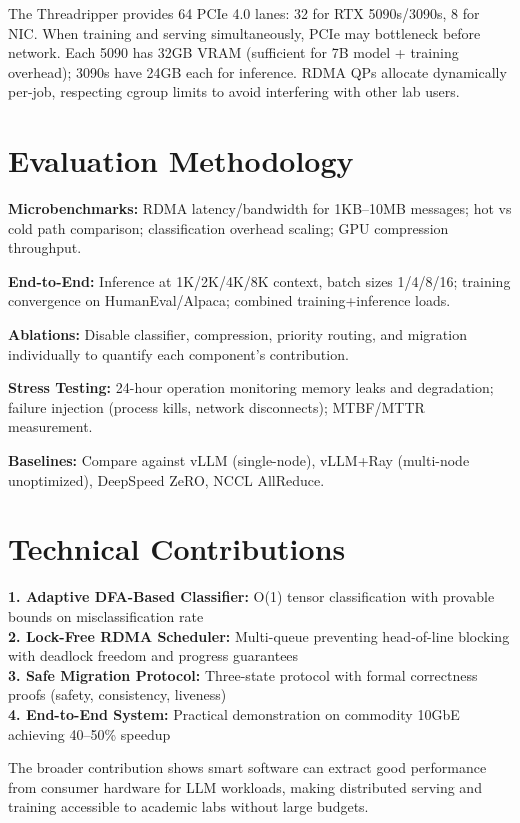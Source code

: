 \documentclass[10pt,letterpaper]{article}
\begin{document}
The Threadripper provides 64 PCIe 4.0 lanes: 32 for RTX 5090s/3090s, 8 for NIC. When training and serving simultaneously, PCIe may bottleneck before network. Each 5090 has 32GB VRAM (sufficient for 7B model + training overhead); 3090s have 24GB each for inference. RDMA QPs allocate dynamically per-job, respecting cgroup limits to avoid interfering with other lab users.

\section{Evaluation Methodology}

\textbf{Microbenchmarks:} RDMA latency/bandwidth for 1KB--10MB messages; hot vs cold path comparison; classification overhead scaling; GPU compression throughput.

\textbf{End-to-End:} Inference at 1K/2K/4K/8K context, batch sizes 1/4/8/16; training convergence on HumanEval/Alpaca; combined training+inference loads.

\textbf{Ablations:} Disable classifier, compression, priority routing, and migration individually to quantify each component's contribution.

\textbf{Stress Testing:} 24-hour operation monitoring memory leaks and degradation; failure injection (process kills, network disconnects); MTBF/MTTR measurement.

\textbf{Baselines:} Compare against vLLM (single-node), vLLM+Ray (multi-node unoptimized), DeepSpeed ZeRO, NCCL AllReduce.

\section{Technical Contributions}

\textbf{1. Adaptive DFA-Based Classifier:} O(1) tensor classification with provable bounds on misclassification rate\\
\textbf{2. Lock-Free RDMA Scheduler:} Multi-queue preventing head-of-line blocking with deadlock freedom and progress guarantees\\
\textbf{3. Safe Migration Protocol:} Three-state protocol with formal correctness proofs (safety, consistency, liveness)\\
\textbf{4. End-to-End System:} Practical demonstration on commodity 10GbE achieving 40--50\% speedup

The broader contribution shows smart software can extract good performance from consumer hardware for LLM workloads, making distributed serving and training accessible to academic labs without large budgets.
\end{document}
